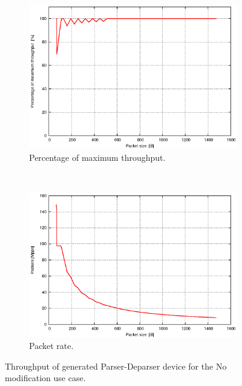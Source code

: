 \begin{figure}
    \centering
    \begin{subfigure}[b]{0.8\textwidth}
        \includegraphics[width=\textwidth]{chapters/pic/graphs/parser-deparser/full-plain/throughput.eps}
        \caption{Percentage of maximum throughput.}
        \label{fig:bitThroughputPlain}
    \end{subfigure}
    ~
    \begin{subfigure}[b]{0.8\textwidth}
        \includegraphics[width=\textwidth]{chapters/pic/graphs/parser-deparser/full-plain/mpps-throughput.eps}
        \caption{Packet rate.}
        \label{fig:packetThroughputPlain}
    \end{subfigure}
    
    \caption{Throughput of generated Parser-Deparser device for the No modification use case.}
    \label{fig:noModThroughput}
\end{figure}

